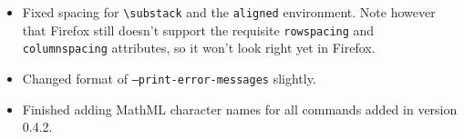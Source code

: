 \documentclass{article}
\newcommand{\texcommand}[1]{\textbackslash{}#1}
\begin{document}
\begin{itemize}
\begin{itemize}
\item Fixed spacing for \texttt{\texcommand{substack}} and the \texttt{aligned} environment. Note however that Firefox still doesn't support the requisite \texttt{rowspacing} and \texttt{columnspacing} attributes, so it won't look right yet in Firefox.
\item Changed format of \texttt{--print-error-messages} slightly.
\item Finished adding MathML character names for all commands added in version 0.4.2.
\end{itemize}
\end{itemize}
\end{document}
